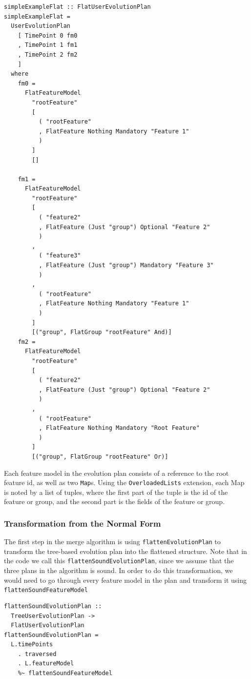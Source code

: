 \documentclass[a4paper,english]{ifimaster}
\begin{document}
\begin{verbatim}
simpleExampleFlat :: FlatUserEvolutionPlan
simpleExampleFlat =
  UserEvolutionPlan
    [ TimePoint 0 fm0
    , TimePoint 1 fm1
    , TimePoint 2 fm2
    ]
  where
    fm0 =
      FlatFeatureModel
        "rootFeature"
        [
          ( "rootFeature"
          , FlatFeature Nothing Mandatory "Feature 1"
          )
        ]
        []

    fm1 =
      FlatFeatureModel
        "rootFeature"
        [
          ( "feature2"
          , FlatFeature (Just "group") Optional "Feature 2"
          )
        ,
          ( "feature3"
          , FlatFeature (Just "group") Mandatory "Feature 3"
          )
        ,
          ( "rootFeature"
          , FlatFeature Nothing Mandatory "Feature 1"
          )
        ]
        [("group", FlatGroup "rootFeature" And)]
    fm2 =
      FlatFeatureModel
        "rootFeature"
        [
          ( "feature2"
          , FlatFeature (Just "group") Optional "Feature 2"
          )
        ,
          ( "rootFeature"
          , FlatFeature Nothing Mandatory "Root Feature"
          )
        ]
        [("group", FlatGroup "rootFeature" Or)]
\end{verbatim}

Each feature model in the evolution plan consists of a reference to the root feature id, as well as two \texttt{Map}s. Using the \texttt{OverloadedLists} extension, each Map is noted by a list of tuples, where the first part of the tuple is the id of the feature or group, and the second part is the fields of the feature or group.

\subsubsection{Transformation from the Normal Form}%
\label{ssub:transformation_from_the_normal_form}

The first step in the merge algorithm is using \texttt{flatten\-Evolution\-Plan} to transform the tree-based evolution plan into the flattened structure. Note that in the code we call this \texttt{flatten\-Sound\-Evolution\-Plan}, since we assume that the three plans in the algorithm is sound. In order to do this transformation, we would need to go through every feature model in the plan and transform it using \texttt{flatten\-Sound\-Feature\-Model}

\begin{verbatim}
flattenSoundEvolutionPlan :: 
  TreeUserEvolutionPlan -> 
  FlatUserEvolutionPlan
flattenSoundEvolutionPlan =
  L.timePoints
    . traversed
    . L.featureModel
    %~ flattenSoundFeatureModel
\end{verbatim}
\end{document}
